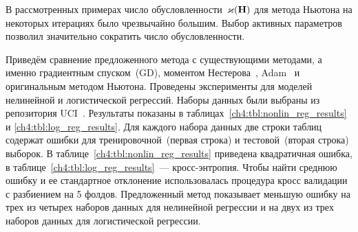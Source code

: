 В рассмотренных примерах число обусловленности~$\varkappa(\mathbf{H})$ для метода Ньютона на некоторых итерациях было чрезвычайно большим. 
Выбор активных параметров позволил значительно сократить число обусловленности. 

Приведём сравнение предложенного метода с существующими методами, а именно градиентным спуском~(GD), моментом Нестерова~\cite{nesterov1983momentum}, Adam~\cite{kingma2014adam} и оригинальным методом Ньютона. 
Проведены эксперименты для моделей нелинейной и логистической регрессий. 
Наборы данных были выбраны из репозитория UCI~\cite{uci2017}. 
Результаты показаны в таблицах~\ref{ch4:tbl:nonlin_reg_results} и \ref{ch4:tbl:log_reg_results}. 
Для каждого набора данных две строки таблиц содержат ошибки для тренировочной~(первая строка) и тестовой~(вторая строка) выборок. 
В таблице~\ref{ch4:tbl:nonlin_reg_results} приведена квадратичная ошибка, в таблице~\ref{ch4:tbl:log_reg_results}~--- кросс-энтропия.
Чтобы найти среднюю ошибку и ее стандартное отклонение использовалась процедура кросс валидации с разбиением на 5 фолдов. 
Предложенный метод показывает меньшую ошибку на трех из четырех наборов данных для нелинейной регрессии и на двух из трех наборов данных для логистической регрессии.

